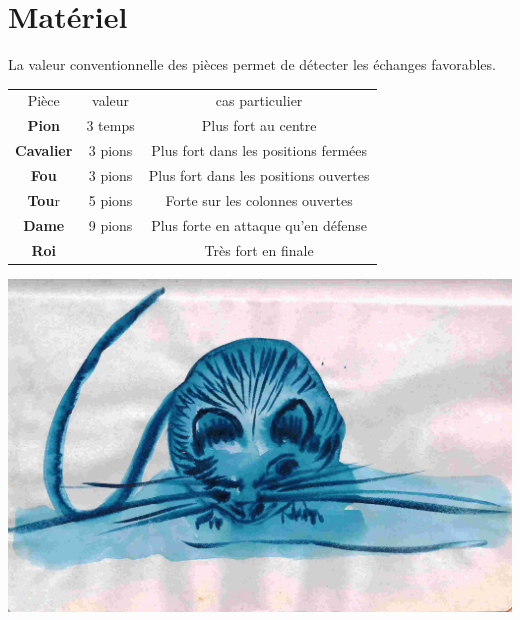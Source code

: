 
\chapter{Matériel}


La valeur conventionnelle des pièces permet de détecter les échanges favorables.

\begin{center}
\begin{tabular}{ccc}
Pièce & valeur & cas particulier \\
{\bf Pion} & 3 temps & Plus fort au centre \\
{\bf Cavalier} & 3 pions & Plus fort dans les positions fermées \\
{\bf Fou} & 3 pions & Plus fort dans les positions ouvertes\\
{\bf Tou}r & 5 pions & Forte sur les colonnes ouvertes \\
{\bf Dame} & 9 pions & Plus forte en attaque qu'en défense\\
{\bf Roi} &  & Très fort en finale\\
\end{tabular}
\end{center}

\vfill

\begin{center}
\includegraphics[scale=.5]{./image/souris10}
\end{center}

\vfill


